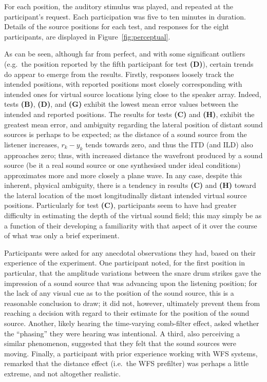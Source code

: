 \documentclass[utf8]{FrontiersinHarvard}
\newcommand{\figref}[1]{Figure~\ref{#1}}
\begin{document}
    For each position, the auditory stimulus was played, and repeated at the
    participant's request.
    Each participation was five to ten minutes in duration.
    Details of the source positions for each test, and responses for the eight
    participants, are displayed in \figref{fig:perceptual}.

    As can be seen, although far from perfect, and with some significant
    outliers (e.g.\ the position reported by the fifth participant for test
    \textbf{(D)}), certain trends do appear to emerge from the results.
    Firstly, responses loosely track the intended positions, with reported
    positions most closely corresponding with intended ones for virtual source
    locations lying close to the speaker array.
    Indeed, tests \textbf{(B)}, \textbf{(D)}, and \textbf{(G)} exhibit the lowest
    mean error values between the intended and reported positions.
    The results for tests \textbf{(C)} and \textbf{(H)}, exhibit the greatest mean
    error, and ambiguity regarding the lateral position of distant sound sources is
    perhaps to be expected;
    as the distance of a sound source from the listener increases, $r_k - y_k$
    tends towards zero, and thus the ITD (and ILD) also approaches zero;
    thus, with increased distance the wavefront produced by a sound source (be it a
    real sound source or one synthesised under ideal conditions) approximates more
    and more closely a plane wave.
    In any case, despite this inherent, physical ambiguity, there is a tendency
    in results \textbf{(C)} and \textbf{(H)} toward the lateral location of the most
    longitudinally distant intended virtual source positions.
    Particularly for test \textbf{(C)}, participants seem to have had greater
    difficulty in estimating the depth of the virtual sound field; this may simply
    be as a function of their developing a familiarity with that aspect of it over
    the course of what was only a brief experiment.

    Participants were asked for any anecdotal observations they had, based on their
    experience of the experiment.
    One participant noted, for the first position in particular, that the amplitude
    variations between the snare drum strikes gave the impression of a sound source
    that was advancing upon the listening position; for the lack of any visual cue
    as to the position of the sound source, this is a reasonable conclusion to draw;
    it did not, however, ultimately prevent them from reaching a decision with
    regard to their estimate for the position of the sound source.
    Another, likely hearing the time-varying comb-filter effect, asked whether the
    ``phasing'' they were hearing was intentional.
    A third, also perceiving a similar phenomenon, suggested that they
    felt that the sound sources were moving.
    Finally, a participant with prior experience working with WFS systems, remarked
    that the distance effect (i.e.\ the WFS prefilter) was perhaps a little extreme,
    and not altogether realistic.
\end{document}
